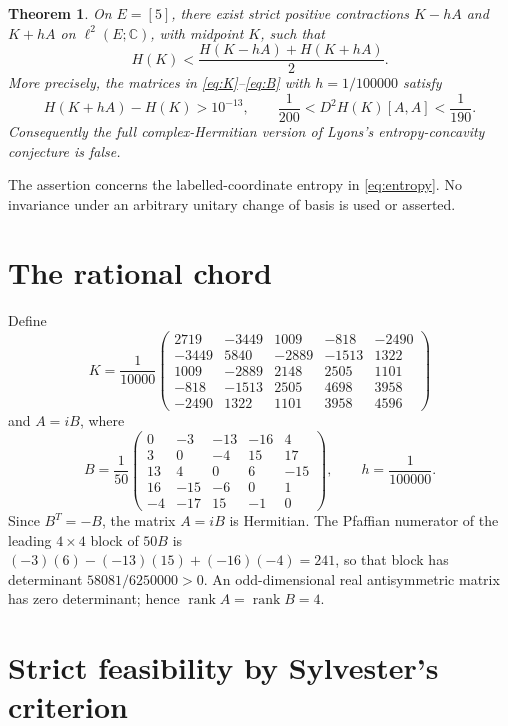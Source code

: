 \documentclass[11pt]{article}
\newtheorem{theorem}{Theorem}
\newcommand{\C}{\mathbb C}
\begin{document}
\begin{theorem}\label{thm:main}
On $E=[5]$, there exist strict positive contractions $K-hA$ and $K+hA$ on
$\ell^2(E;\C)$, with midpoint $K$, such that
\[
 H(K)<\frac{H(K-hA)+H(K+hA)}2.
\]
More precisely, the matrices in \eqref{eq:K}--\eqref{eq:B} with
$h=1/100000$ satisfy
\[
 H(K+hA)-H(K)>10^{-13},
 \qquad
 \frac1{200}<D^2H(K)[A,A]<\frac1{190}.
\]
Consequently the full complex-Hermitian version of Lyons's entropy-concavity
conjecture is false.
\end{theorem}

The assertion concerns the labelled-coordinate entropy in \eqref{eq:entropy}.
No invariance under an arbitrary unitary change of basis is used or asserted.

\section{The rational chord}

Define
\begin{equation}\label{eq:K}
K=\frac1{10000}
\begin{pmatrix}
2719&-3449&1009&-818&-2490\\
-3449&5840&-2889&-1513&1322\\
1009&-2889&2148&2505&1101\\
-818&-1513&2505&4698&3958\\
-2490&1322&1101&3958&4596
\end{pmatrix}
\end{equation}
and $A=iB$, where
\begin{equation}\label{eq:B}
B=\frac1{50}
\begin{pmatrix}
0&-3&-13&-16&4\\
3&0&-4&15&17\\
13&4&0&6&-15\\
16&-15&-6&0&1\\
-4&-17&15&-1&0
\end{pmatrix},
\qquad h=\frac1{100000}.
\end{equation}
Since $B^T=-B$, the matrix $A=iB$ is Hermitian.  The Pfaffian numerator of
the leading $4\times4$ block of $50B$ is
$(-3)(6)-(-13)(15)+(-16)(-4)=241$, so that block has determinant
$58081/6250000>0$.  An odd-dimensional real antisymmetric matrix has zero
determinant; hence $\operatorname{rank}A=\operatorname{rank}B=4$.

\section{Strict feasibility by Sylvester's criterion}
\end{document}
